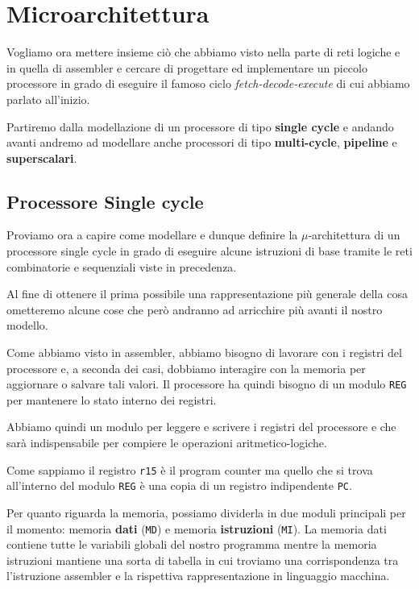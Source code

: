 \chapter{Microarchitettura}
Vogliamo ora mettere insieme ciò che abbiamo visto nella parte di reti logiche e in quella di
assembler e cercare di progettare ed implementare un piccolo processore in grado di eseguire
il famoso ciclo \emph{fetch-decode-execute} di cui abbiamo parlato all'inizio.

Partiremo dalla modellazione di un processore di tipo \textbf{single cycle} e andando avanti
andremo ad modellare anche processori di tipo \textbf{multi-cycle}, \textbf{pipeline} e
\textbf{superscalari}.

\section{Processore Single cycle}
Proviamo ora a capire come modellare e dunque definire la $\mu$-architettura di un processore
single cycle in grado di eseguire alcune istruzioni di base tramite le reti combinatorie e
sequenziali viste in precedenza.

Al fine di ottenere il prima possibile una rappresentazione più generale della cosa ometteremo
alcune cose che però andranno ad arricchire più avanti il nostro modello.

Come abbiamo visto in assembler, abbiamo bisogno di lavorare con i registri del processore e, a
seconda dei casi, dobbiamo interagire con la memoria per aggiornare o salvare tali valori. Il
processore ha quindi bisogno di un modulo \verb|REG| per mantenere lo stato interno dei registri.
\begin{center}
	
\end{center}
Abbiamo quindi un modulo per leggere e scrivere i registri del processore e che sarà indispensabile
per compiere le operazioni aritmetico-logiche.

Come sappiamo il registro \verb|r15| è il program counter ma quello che si trova all'interno del
modulo \verb|REG| è una copia di un registro indipendente \verb|PC|.

Per quanto riguarda la memoria, possiamo dividerla in due moduli principali per il momento: memoria
\textbf{dati} (\verb|MD|) e memoria \textbf{istruzioni} (\verb|MI|). La memoria dati contiene tutte
le variabili globali del nostro programma mentre la memoria istruzioni mantiene una sorta di
tabella in cui troviamo una corrispondenza tra l'istruzione assembler e la rispettiva
rappresentazione in linguaggio macchina.

